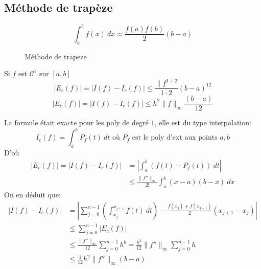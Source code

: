 \subsection{Méthode de trapèze}
\begin{definition}
    \[
        \int_{{a}}^{{b}} {f(x)} \: d{x} \approx \frac{f(a)f(b)}{2}(b - a)
    \] 
\begin{figure}[H]
    \centering
    \caption{Méthode de trapeze}
    \label{fig:methode-de-trapeze}
\end{figure}
\end{definition}
\begin{prop}
    Si $f$ est  $\mathcal{C}^{?}$ sur  $[a, b]$ 
    \[
        \left| E_c(f) \right| = \left| I(f) - I_c(f) \right| \le \frac{\|f^{1 + 2}}{1 \cdot 2}(b - a)^{12}
    \] 
    \[
        \left| E_c(f) \right| = \left| I(f) - I_c(f) \right| \le h^{2} \|f\|_{\infty}\frac{(b - a)}{12}
    \] 
\end{prop}
\begin{preuve}
   La formule était exacte pour les poly de degré $1$, elle est du type interpolation:
   \[
   I_c(f) = \int_{{a}}^{{b}} {P_f(t)} \: d{t} \text{ où }  P_f \text{ est le poly d'ext aux points } a, b
   \] 
   D'où
   \begin{align*}
       \left| E_c(f) \right| = \left| I(f) - I_c(f) \right| &= \left| \int_{{a}}^{{b}} {(f(t) - P_f(t))} \: d{t} {} \right| \\
                                                            &\le  \frac{\|f''\|_{\infty}}{2!}\int_{{a}}^{{b}} {(x - a)(b - x)} \: d{x} {}
   \end{align*}
   On en déduit que:
   \begin{align*}
       \left| I(f) - I_c(f) \right| &= \left| \sum_{j=0}^{n-1} \left( \int_{{x_j}}^{{x_{j+1}}} {f(t)} \: d{t} \right) - \frac{f(x_j) + f(x_{j+1})}{2}(x_{j+1} - x_{j}) \right| \\
                                    &\le \sum_{j=0}^{n-1} |E_c(f)| \\
                                    &\le \frac{\|f''\|_{\infty}}{12}\sum_{j=0}^{n-1} h^b = \frac{h^2}{12}\|f''\|_{\infty}\sum_{j=0}^{n-1} h\\
                                    &\le \frac{1}{12}h^2 \|f''\|_{\infty}(b - a)
   \end{align*}
\end{preuve}

